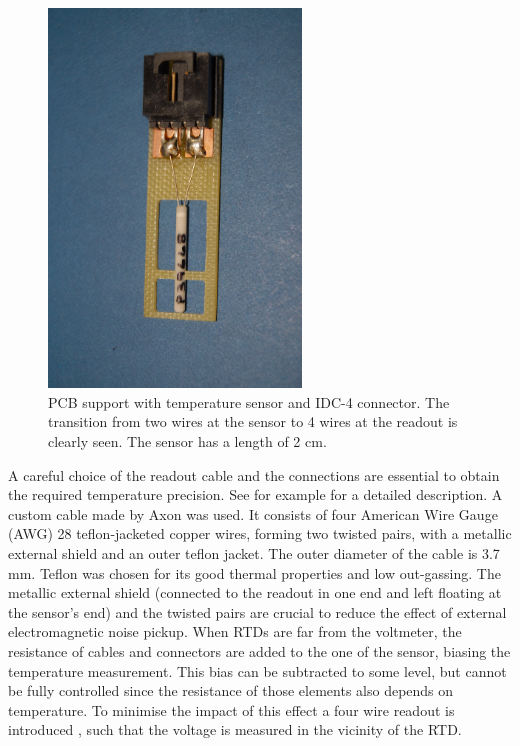 \begin{figure}[htbp]
\begin{center}
\includegraphics[angle=-90, width=0.6\textwidth]{images/figure_1.jpg}%
\caption{PCB support with temperature sensor and IDC-4 connector. The transition from two wires at the sensor to 4 wires at the readout is clearly seen. The sensor has a length of 2 cm.
\label{fig:sensor}}
\end{center}
\end{figure}

A careful choice of the readout cable and the connections are essential to obtain the required temperature precision. See for example \cite{minco} for a detailed description. A custom cable made by Axon \cite{axon} was used. It consists of four American Wire Gauge (AWG) 28 teflon-jacketed copper wires, forming two twisted pairs, with a metallic external shield and an outer teflon jacket. The outer diameter of the cable is 3.7 mm. Teflon was chosen for its good thermal properties and low out-gassing. The metallic external shield (connected to the readout in one end and left floating at the sensor's end) and the twisted pairs are crucial to reduce the effect of external electromagnetic noise pickup. When RTDs are far from the voltmeter, the resistance of cables and connectors are added to the one of the sensor, biasing the temperature measurement. This bias can be subtracted to some level, but cannot be fully controlled since the resistance of those elements also depends on temperature. To minimise the impact of this effect a four wire readout is introduced \cite{minco}, such that the voltage is measured in the vicinity of the RTD.  


